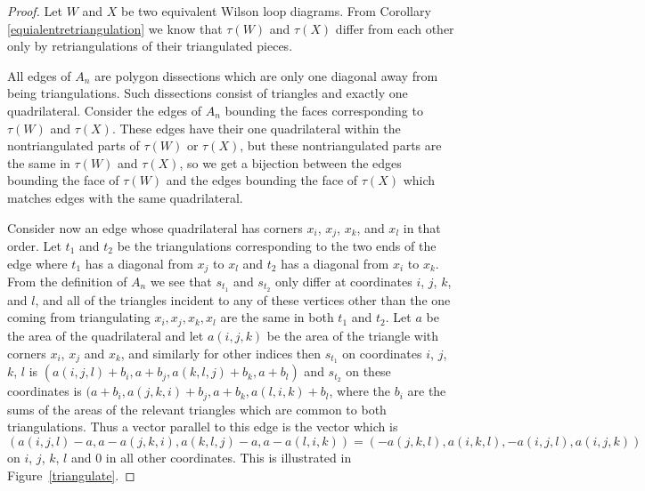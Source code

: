\documentclass[11pt]{article}
\theoremstyle{remark}
\theoremstyle{definition}
\begin{document}
\begin{proof}
  Let $W$ and $X$ be two equivalent Wilson loop diagrams.  From Corollary \ref{equialentretriangulation} we know that $\tau(W)$ and $\tau(X)$ differ from each other only by retriangulations of their triangulated pieces. 

All edges of $A_n$ are polygon dissections which are only one diagonal away from being triangulations.  Such dissections consist of triangles and exactly one quadrilateral.  Consider the edges of $A_n$ bounding the faces corresponding to $\tau(W)$ and $\tau(X)$.  These edges have their one quadrilateral within the nontriangulated parts of $\tau(W)$ or $\tau(X)$, but these nontriangulated parts are the same in $\tau(W)$ and $\tau(X)$, so we get a bijection between the edges bounding the face of $\tau(W)$ and the edges bounding the face of $\tau(X)$ which matches edges with the same quadrilateral.

  Consider now an edge whose quadrilateral has corners $x_i$, $x_j$, $x_k$, and $x_l$ in that order.  Let $t_1$ and $t_2$ be the triangulations corresponding to the two ends of the edge where $t_1$ has a diagonal from $x_j$ to $x_l$ and $t_2$ has a diagonal from $x_i$ to $x_k$.  From the definition of $A_n$ we see that $s_{t_1}$ and $s_{t_2}$ only differ at coordinates $i$, $j$, $k$, and $l$, and all of the triangles incident to any of these vertices other than the one coming from triangulating $x_i, x_j, x_k, x_l$ are the same in both $t_1$ and $t_2$.  Let $a$ be the area of the quadrilateral and let $a(i,j,k)$ be the area of the triangle with corners $x_i$, $x_j$ and $x_k$, and similarly for other indices then $s_{t_1}$ on coordinates $i$, $j$, $k$, $l$ is $(a(i,j,l) + b_i, a+b_j, a(k,l,j)+b_k, a+b_l)$ and $s_{t_2}$ on these coordinates is $(a + b_i, a(j,k,i)+b_j, a+b_k, a(l,i,k)+b_l$, where the $b_i$ are the sums of the areas of the relevant triangles which are common to both triangulations.  Thus a vector parallel to this edge is the vector which is 
  \[(a(i,j,l) - a, a-a(j,k,i), a(k,l,j)-a, a-a(l,i,k)) = (-a(j,k,l), a(i,k,l), -a(i,j,l), a(i,j,k))\]
  on $i$, $j$, $k$, $l$ and $0$ in all other coordinates.  This is illustrated in Figure~\ref{triangulate}.


\end{proof}
\end{document}

